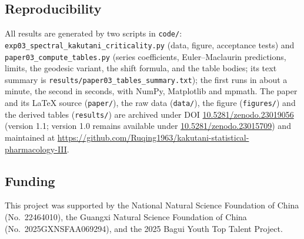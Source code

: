 \documentclass[11pt,reqno]{amsart}
\theoremstyle{plain}
\theoremstyle{definition}
\theoremstyle{remark}
\numberwithin{equation}{section}
\begin{document}
\subsection*{Reproducibility}
\begin{sloppypar}
All results are generated by two scripts in \texttt{code/}: \texttt{exp03\_spectral\_kakutani\_criticality.py} (data, figure, acceptance tests) and \texttt{paper03\_compute\_tables.py} (series coefficients, Euler--Maclaurin predictions, limits, the geodesic variant, the shift formula, and the table bodies; its text summary is \texttt{results/paper03\_tables\_summary.txt}); the first runs in about a minute, the second in seconds, with NumPy, Matplotlib and mpmath. The paper and its \LaTeX{} source (\texttt{paper/}), the raw data (\texttt{data/}), the figure (\texttt{figures/}) and the derived tables (\texttt{results/}) are archived under DOI \href{https://doi.org/10.5281/zenodo.23019056}{10.5281/zenodo.23019056} (version 1.1; version 1.0 remains available under \href{https://doi.org/10.5281/zenodo.23015709}{10.5281/zenodo.23015709}) and maintained at \url{https://github.com/Ruqing1963/kakutani-statistical-pharmacology-III}.
\end{sloppypar}

\subsection*{Funding}
This project was supported by the National Natural Science Foundation of China (No.~22464010), the Guangxi Natural Science Foundation of China (No.~2025GXNSFAA069294), and the 2025 Bagui Youth Top Talent Project.
\end{document}
